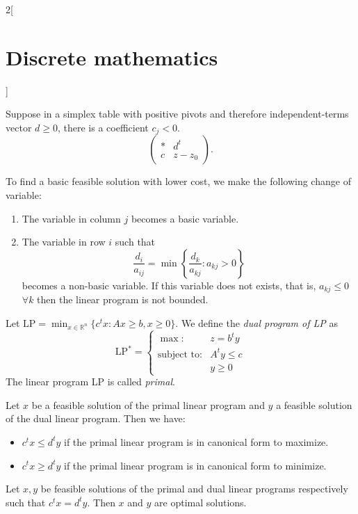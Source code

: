 \documentclass[class=article,10pt,crop=false]{standalone}
\begin{document}
\begin{multicols}{2}[\section{Discrete mathematics}]
\begin{definition}
\end{definition}
\begin{prop}
Suppose in a simplex table with positive pivots and therefore independent-terms vector $d\geq 0$, there is a coefficient $c_j<0$. $$\left(\begin{array}{c|c}
    * & d^t\\
    \hline
    c & z-z_0
\end{array}\right).$$
\end{prop}
To find a basic feasible solution with lower cost, we make the following change of variable:
\begin{enumerate}
    \item The variable in column $j$ becomes a basic variable.
    \item The variable in row $i$ such that $$\frac{d_i}{a_{ij}}=\min\left\{\frac{d_k}{a_{kj}}:a_{kj}>0\right\}$$ becomes a non-basic variable. If this variable does not exists, that is, $a_{kj}\leq0$ $\forall k$ then the linear program is not bounded.
\end{enumerate}
\begin{definition}
Let $\text{LP}=\displaystyle\min_{x\in\mathbb{R}^n}\{c^tx:Ax\geq b,x\geq 0\}$. We define the \textit{dual program of LP} as $$\text{LP}^*=\left\{\begin{array}{rc}
    \max: & z=b^ty \\
    \text{subject to}: & A^ty\leq c\\
     & y\geq 0
    \end{array}\right.$$ The linear program LP is called \textit{primal}.
\end{definition}
\begin{theorem}
Let $x$ be a feasible solution of the primal linear program and $y$ a feasible solution of the dual linear program. Then we have:
\begin{itemize}
    \item $c^tx\leq d^ty$ if the primal linear program is in canonical form to maximize.
    \item $c^tx\geq d^ty$ if the primal linear program is in canonical form to minimize.
\end{itemize}
\end{theorem}
\begin{corollary}
Let $x,y$ be feasible solutions of the primal and dual linear programs respectively such that $c^tx=d^ty$. Then $x$ and $y$ are optimal solutions.
\end{corollary}

\end{multicols}
\end{document}
